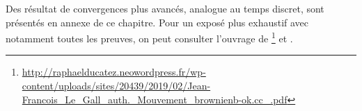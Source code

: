
Des résultat de convergences plus avancés, analogue au temps discret, sont présentés en annexe de ce chapitre. Pour un exposé plus exhaustif avec notamment toutes les preuves, on peut consulter l'ouvrage de \citet[Chapitre 3]{Gall2012}\footnote{\url{http://raphaelducatez.neowordpress.fr/wp-content/uploads/sites/20439/2019/02/Jean-Francois_Le_Gall_auth._Mouvement_brownienb-ok.cc_.pdf}} et \citet[Chapitre 5]{laleuf14}. 

